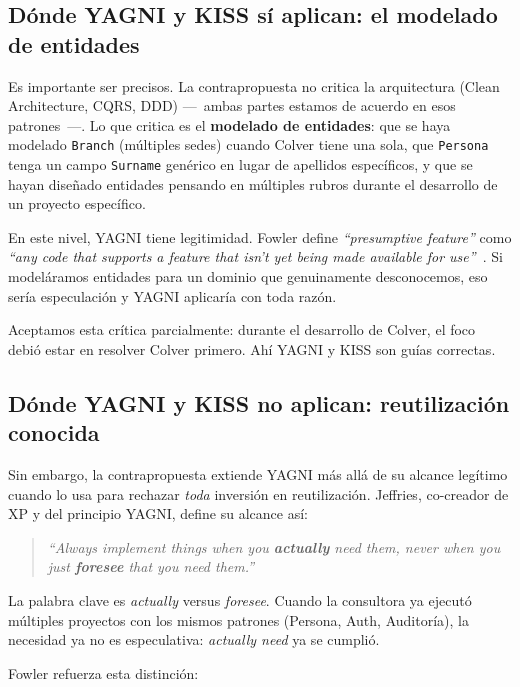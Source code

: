 \documentclass[conference]{IEEEtran}
\begin{document}
\subsection{D\'onde YAGNI y KISS s\'i aplican: el modelado de entidades}

Es importante ser precisos. La contrapropuesta no critica la
arquitectura (Clean Architecture, CQRS, DDD) ---~ambas partes
estamos de acuerdo en esos patrones~---. Lo que critica es el
\textbf{modelado de entidades}: que se haya modelado
\texttt{Branch} (m\'ultiples sedes) cuando Colver tiene una sola,
que \texttt{Persona} tenga un campo \texttt{Surname} gen\'erico
en lugar de apellidos espec\'ificos, y que se hayan dise\~nado
entidades pensando en m\'ultiples rubros durante el desarrollo de
un proyecto espec\'ifico.

En este nivel, YAGNI tiene legitimidad. Fowler define
\textit{``presumptive feature''} como \textit{``any code that
supports a feature that isn't yet being made available for
use''}~\cite{fowler2015yagni}. Si model\'aramos entidades para un
dominio que genuinamente desconocemos, eso ser\'ia especulaci\'on
y YAGNI aplicar\'ia con toda raz\'on.

Aceptamos esta cr\'itica parcialmente: durante el desarrollo de
Colver, el foco debi\'o estar en resolver Colver primero. Ah\'i
YAGNI y KISS son gu\'ias correctas.

\subsection{D\'onde YAGNI y KISS no aplican: reutilizaci\'on conocida}

Sin embargo, la contrapropuesta extiende YAGNI m\'as all\'a de su
alcance leg\'itimo cuando lo usa para rechazar \textit{toda}
inversi\'on en reutilizaci\'on. Jeffries, co-creador de XP y del
principio YAGNI, define su alcance as\'i:

\begin{quote}
\textit{``Always implement things when you \textbf{actually} need
them, never when you just \textbf{foresee} that you need
them.''}~\cite{jeffries_yagni}
\end{quote}

La palabra clave es \textit{actually} versus \textit{foresee}.
Cuando la consultora ya ejecut\'o m\'ultiples proyectos con los
mismos patrones (Persona, Auth, Auditor\'ia), la necesidad ya no
es especulativa: \textit{actually need} ya se cumpli\'o.

Fowler refuerza esta distinci\'on:
\end{document}
